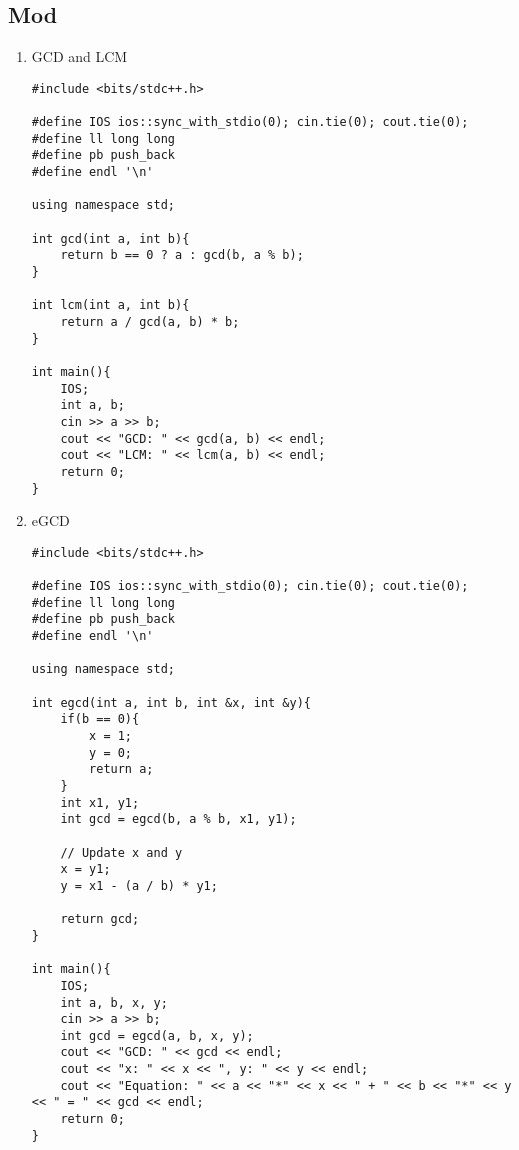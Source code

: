 \documentclass[12pt, a4paper]{article}
\begin{document}
\subsection{Mod}
\begin{enumerate}
\item {GCD and LCM}
\begin{lstlisting}
#include <bits/stdc++.h>

#define IOS ios::sync_with_stdio(0); cin.tie(0); cout.tie(0);
#define ll long long
#define pb push_back
#define endl '\n'

using namespace std;

int gcd(int a, int b){
    return b == 0 ? a : gcd(b, a % b);
}

int lcm(int a, int b){
    return a / gcd(a, b) * b;
}

int main(){
    IOS;
    int a, b;
    cin >> a >> b;
    cout << "GCD: " << gcd(a, b) << endl;
    cout << "LCM: " << lcm(a, b) << endl; 
    return 0;
}
\end{lstlisting}
\item {eGCD}
\begin{lstlisting}
#include <bits/stdc++.h>

#define IOS ios::sync_with_stdio(0); cin.tie(0); cout.tie(0);
#define ll long long
#define pb push_back
#define endl '\n'

using namespace std;

int egcd(int a, int b, int &x, int &y){
    if(b == 0){
        x = 1;
        y = 0;
        return a;
    }
    int x1, y1;
    int gcd = egcd(b, a % b, x1, y1);

    // Update x and y
    x = y1;
    y = x1 - (a / b) * y1;

    return gcd;
}

int main(){
    IOS;
    int a, b, x, y;
    cin >> a >> b;
    int gcd = egcd(a, b, x, y);
    cout << "GCD: " << gcd << endl;
    cout << "x: " << x << ", y: " << y << endl;
    cout << "Equation: " << a << "*" << x << " + " << b << "*" << y << " = " << gcd << endl;
    return 0;
}
\end{lstlisting}
\end{enumerate}
\end{document}
